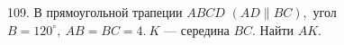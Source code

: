 109. В прямоугольной трапеции $ABCD$ $(AD\parallel BC),$ угол $B=120^\circ,\ AB=BC=4.\ K$ --- середина $BC.$ Найти $AK.$\\
